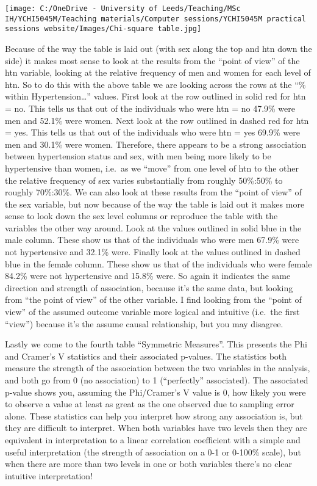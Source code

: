 \documentclass[
]{book}
\begin{document}
\texttt{[image: C:/OneDrive - University of Leeds/Teaching/MSc IH/YCHI5045M/Teaching materials/Computer sessions/YCHI5045M practical sessions website/Images/Chi-square table.jpg]}

Because of the way the table is laid out (with sex along the top and htn down the side) it makes most sense to look at the results from the ``point of view'' of the htn variable, looking at the relative frequency of men and women for each level of htn. So to do this with the above table we are looking across the rows at the ``\% within Hypertension\ldots{}'' values. First look at the row outlined in solid red for htn = no. This tells us that out of the individuals who were htn = no 47.9\% were men and 52.1\% were women. Next look at the row outlined in dashed red for htn = yes. This tells us that out of the individuals who were htn = yes 69.9\% were men and 30.1\% were women. Therefore, there appears to be a strong association between hypertension status and sex, with men being more likely to be hypertensive than women, i.e.~as we ``move'' from one level of htn to the other the relative frequency of sex varies substantially from roughly 50\%:50\% to roughly 70\%:30\%. We can also look at these results from the ``point of view'' of the sex variable, but now because of the way the table is laid out it makes more sense to look down the sex level columns or reproduce the table with the variables the other way around. Look at the values outlined in solid blue in the male column. These show us that of the individuals who were men 67.9\% were not hypertensive and 32.1\% were. Finally look at the values outlined in dashed blue in the female column. These show us that of the individuals who were female 84.2\% were not hypertensive and 15.8\% were. So again it indicates the same direction and strength of association, because it's the same data, but looking from ``the point of view'' of the other variable. I find looking from the ``point of view'' of the assumed outcome variable more logical and intuitive (i.e.~the first ``view'') because it's the assume causal relationship, but you may disagree.

Lastly we come to the fourth table ``Symmetric Measures''. This presents the Phi and Cramer's V statistics and their associated p-values. The statistics both measure the strength of the association between the two variables in the analysis, and both go from 0 (no association) to 1 (``perfectly'' associated). The associated p-value shows you, assuming the Phi/Cramer's V value is 0, how likely you were to observe a value at least as great as the one observed due to sampling error alone. These statistics can help you interpret how strong any association is, but they are difficult to interpret. When both variables have two levels then they are equivalent in interpretation to a linear correlation coefficient with a simple and useful interpretation (the strength of association on a 0-1 or 0-100\% scale), but when there are more than two levels in one or both variables there's no clear intuitive interpretation!
\end{document}
